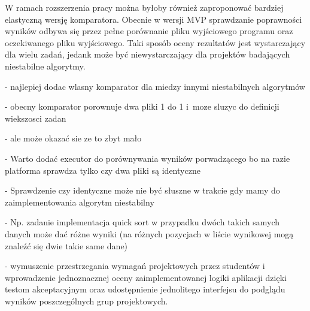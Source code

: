 W ramach rozszerzenia pracy można byłoby również zaproponować bardziej elastyczną wersję komparatora.
Obecnie w wersji MVP sprawdzanie poprawności wyników odbywa się przez pełne porównanie pliku wyjściowego programu oraz oczekiwanego pliku wyjściowego.
Taki sposób oceny rezultatów jest wystarczający dla wielu zadań, jedank może być niewystarczający dla projektów badających niestabilne algorytmy.

- najlepiej dodac wlasny komparator dla miedzy innymi niestabilnych algorytmów

- obecny komparator porownuje dwa pliki 1 do 1 i~moze sluzyc do definicji wiekszosci zadan

- ale może okazać sie ze to zbyt mało

- Warto dodać executor do porównywania wyników porwadzącego bo na razie platforma sprawdza tylko czy dwa pliki są identyczne

- Sprawdzenie czy identyczne może nie być słuszne w trakcie gdy mamy do zaimplementowania algorytm niestabilny

- Np. zadanie implementacja quick sort w przypadku dwóch takich samych danych może dać różne wyniki (na różnych pozycjach w liście wynikowej mogą znaleźć się dwie takie same dane)

- wymuszenie przestrzegania wymagań projektowych przez studentów i wprowadzenie jednoznacznej oceny zaimplementowanej logiki aplikacji dzięki testom akceptacyjnym oraz udostępnienie jednolitego interfejsu do podglądu wyników poszczególnych grup projektowych.
